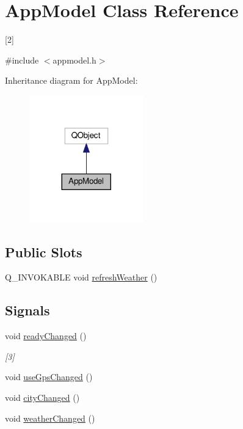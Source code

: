 \hypertarget{class_app_model}{}\section{App\+Model Class Reference}
\label{class_app_model}


\mbox{[}2\mbox{]}  




{\ttfamily \#include $<$appmodel.\+h$>$}



Inheritance diagram for App\+Model\+:\nopagebreak
\begin{figure}[H]
\begin{center}
\leavevmode
\includegraphics[width=140pt]{class_app_model__inherit__graph}
\end{center}
\end{figure}
\subsection*{Public Slots}
\begin{DoxyCompactItemize}
\item 
Q\+\_\+\+I\+N\+V\+O\+K\+A\+B\+LE void \hyperlink{class_app_model_a37e1da9d028779f7f0fc908e4c04fa76}{refresh\+Weather} ()
\end{DoxyCompactItemize}
\subsection*{Signals}
\begin{DoxyCompactItemize}
\item 
void \hyperlink{class_app_model_a574c2bd6f5c92ac9268107f8399989cb}{ready\+Changed} ()
\begin{DoxyCompactList}\small\item\em \mbox{[}3\mbox{]} \end{DoxyCompactList}\item 
void \hyperlink{class_app_model_af0007ee4da862433868baa5fdb31a3fe}{use\+Gps\+Changed} ()
\item 
void \hyperlink{class_app_model_aeb28c7a57316aaf6295a943a65f60569}{city\+Changed} ()
\item 
void \hyperlink{class_app_model_a83e61455ed5672333b0db45f3f86417c}{weather\+Changed} ()
\end{DoxyCompactItemize}
